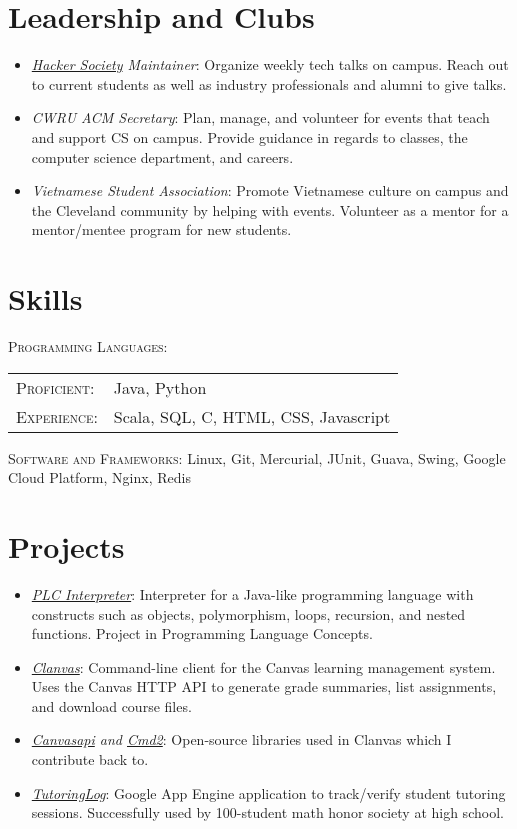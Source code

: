 \documentclass[a4paper,11pt]{article}
\begin{document}
\section{Leadership and Clubs}
\begin{itemize}[noitemsep]
	\item \emph{\href{http://hacsoc.org}{Hacker Society} Maintainer}: Organize weekly tech talks on campus. Reach out to current students as well as industry professionals and alumni to give talks.
	\item \emph{CWRU ACM Secretary}: Plan, manage, and volunteer for events that teach and support CS on campus. Provide guidance in regards to classes, the computer science department, and careers.
	\item \emph{Vietnamese Student Association}: Promote Vietnamese culture on campus and the Cleveland community by helping with events. Volunteer as a mentor for a mentor/mentee program for new students.
\end{itemize}
\section{Skills}
\textsc{Programming Languages}:
\begin{tabular}[noitemsep]{ll}
	\textsc{Proficient}: & Java, Python \\
	\textsc{Experience}: & Scala, SQL, C, HTML, CSS, Javascript \\
\end{tabular}

\textsc{Software and Frameworks}: Linux, Git, Mercurial, JUnit, Guava, Swing, Google Cloud Platform, Nginx, Redis
\section{Projects}
\begin{itemize}
    \item \emph{\href{https://github.com/marklalor/PLCInterpreter}{PLC Interpreter}}: Interpreter for a Java-like programming language with constructs such as objects, polymorphism, loops, recursion, and nested functions. Project in Programming Language Concepts.
    \item \emph{\href{https://github.com/marklalor/clanvas}{Clanvas}}: Command-line client for the Canvas learning management system. Uses the Canvas HTTP API to generate grade summaries, list assignments, and download course files.
    \item \emph{\href{https://github.com/ucfopen/canvasapi}{Canvasapi} and \href{https://github.com/python-cmd2/cmd2}{Cmd2}}: Open-source libraries used in Clanvas which I contribute back to.
    \item \emph{\href{https://github.com/marklalor/Tutoring-Log}{TutoringLog}}: Google App Engine application to track/verify student tutoring sessions. Successfully used by 100-student math honor society at high school.
\end{itemize}
\end{document}
